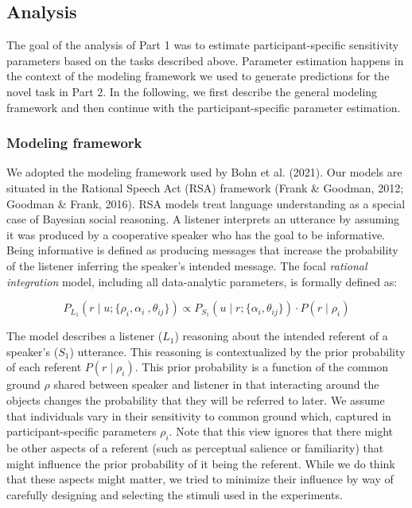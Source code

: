 \documentclass[
  man,floatsintext]{apa6}
\begin{document}
\hypertarget{analysis}{%
\subsection{Analysis}\label{analysis}}

The goal of the analysis of Part 1 was to estimate participant-specific sensitivity parameters based on the tasks described above. Parameter estimation happens in the context of the modeling framework we used to generate predictions for the novel task in Part 2. In the following, we first describe the general modeling framework and then continue with the participant-specific parameter estimation.

\hypertarget{modeling-framework}{%
\subsubsection{Modeling framework}\label{modeling-framework}}

We adopted the modeling framework used by Bohn et al. (2021). Our models are situated in the Rational Speech Act (RSA) framework (Frank \& Goodman, 2012; Goodman \& Frank, 2016). RSA models treat language understanding as a special case of Bayesian social reasoning. A listener interprets an utterance by assuming it was produced by a cooperative speaker who has the goal to be informative. Being informative is defined as producing messages that increase the probability of the listener inferring the speaker's intended message. The focal \emph{rational integration} model, including all data-analytic parameters, is formally defined as:

\begin{equation}
P_{L_1}(r \mid u; \{\rho_i, \alpha_i\ , \theta_{ij}\})\propto P_{S_1}(u \mid r; \{\alpha_i, \theta_{ij}\}) \cdot P(r \mid \rho_i)
\label{eq:rsafull1}
\end{equation}

The model describes a listener (\(L_1\)) reasoning about the intended referent of a speaker's (\(S_1\)) utterance. This reasoning is contextualized by the prior probability of each referent \(P(r \mid \rho_i)\). This prior probability is a function of the common ground \(\rho\) shared between speaker and listener in that interacting around the objects changes the probability that they will be referred to later. We assume that individuals vary in their sensitivity to common ground which, captured in participant-specific parameters \(\rho_i\). Note that this view ignores that there might be other aspects of a referent (such as perceptual salience or familiarity) that might influence the prior probability of it being the referent. While we do think that these aspects might matter, we tried to minimize their influence by way of carefully designing and selecting the stimuli used in the experiments.
\end{document}
